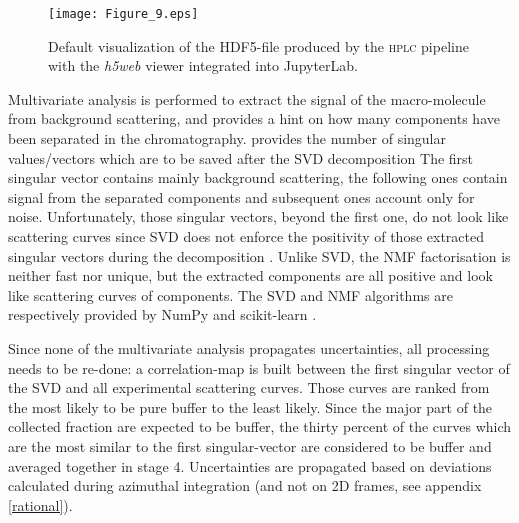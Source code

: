 \documentclass[preprint]{iucr}              %
\begin{document}
\begin{figure}
    \label{hplc}
    \texttt{[image: Figure\_9.eps]}
    \caption{Default visualization of the HDF5-file produced by the \textsc{hplc} pipeline with the \textit{h5web} viewer integrated into JupyterLab.}
\end{figure}

Multivariate analysis is performed to extract the signal of the macro-molecule from background scattering, and provides a hint on how many components have been separated in the chromatography.
 provides the number of singular values/vectors which are to be saved after the SVD decomposition
The first singular vector contains mainly background scattering, the following ones contain signal from the separated components and subsequent ones account only for noise.
Unfortunately, those singular vectors, beyond the first one, do not look like scattering curves since SVD does not enforce the positivity of those extracted singular vectors during the decomposition \cite{NNMF_spectro}. 
Unlike SVD, the NMF factorisation is neither fast nor unique, but the extracted components are all positive and look like scattering curves of components. 
The SVD and NMF algorithms are respectively provided by NumPy \cite{numpy} and scikit-learn \cite{sklearn}.


Since none of the multivariate analysis propagates uncertainties, all processing needs to be re-done:
a correlation-map is built between the first singular vector of the SVD and all experimental scattering curves. 
Those curves are ranked from the most likely to be pure buffer to the least likely. 
Since the major part of the collected fraction are expected to be buffer, the thirty percent of the curves which are the most similar to the first singular-vector are considered to be buffer and averaged together in stage 4.
Uncertainties are propagated based on deviations calculated during azimuthal integration (and not on 2D frames, see appendix \ref{rational}).
\end{document}

